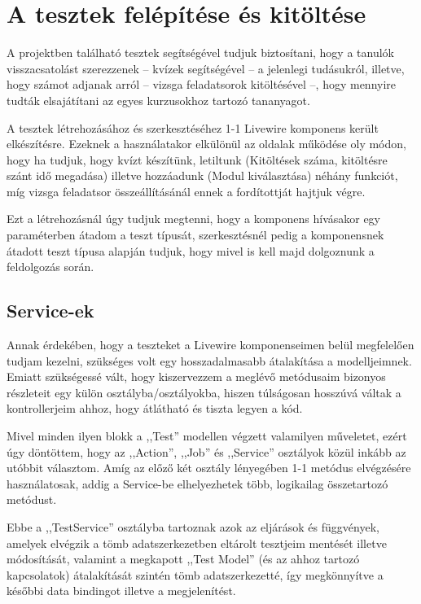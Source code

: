 \documentclass[
]{thesis-ekf}
\theoremstyle{definition}
\theoremstyle{remark}
\begin{document}
        \chapter{A tesztek felépítése és kitöltése}\label{Tesztek-bemutat}
            A projektben található tesztek segítségével tudjuk biztosítani, hogy a tanulók visszacsatolást szerezzenek -- kvízek segítségével -- a jelenlegi tudásukról, illetve, hogy számot adjanak arról -- vizsga feladatsorok kitöltésével --, hogy mennyire tudták elsajátítani az egyes kurzusokhoz tartozó tananyagot.

            A tesztek létrehozásához és szerkesztéséhez 1-1 Livewire komponens került elkészítésre. Ezeknek a használatakor elkülönül az oldalak működése oly módon, hogy ha tudjuk, hogy kvízt készítünk, letiltunk (Kitöltések száma, kitöltésre szánt idő megadása) illetve hozzáadunk (Modul kiválasztása) néhány funkciót, míg vizsga feladatsor összeállításánál ennek a fordítottját hajtjuk végre. 
            
            Ezt a létrehozásnál úgy tudjuk megtenni, hogy a komponens hívásakor egy paraméterben átadom a teszt típusát, szerkesztésnél pedig a komponensnek átadott teszt típusa alapján tudjuk, hogy mivel is kell majd dolgoznunk a feldolgozás során.
      
            \section{Service-ek}
            Annak érdekében, hogy a teszteket a Livewire komponenseimen belül megfelelően tudjam kezelni, szükséges volt egy hosszadalmasabb átalakítása a modelljeimnek. Emiatt szükségessé vált, hogy kiszervezzem a meglévő metódusaim bizonyos részleteit egy külön osztályba/osztályokba, hiszen túlságosan hosszúvá váltak a kontrollerjeim ahhoz, hogy átlátható és tiszta legyen a kód.

            Mivel minden ilyen blokk a ,,Test'' modellen végzett valamilyen műveletet, ezért úgy döntöttem, hogy az ,,Action'', ,,Job'' és ,,Service'' osztályok közül inkább az utóbbit választom. Amíg az előző két osztály lényegében 1-1 metódus elvégzésére használatosak, addig a Service-be elhelyezhetek több, logikailag összetartozó metódust. 
            
            Ebbe a ,,TestService'' osztályba tartoznak azok az eljárások és függvények, amelyek elvégzik a tömb adatszerkezetben eltárolt tesztjeim mentését illetve módosítását, valamint a megkapott ,,Test Model'' (és az ahhoz tartozó kapcsolatok) átalakítását szintén tömb adatszerkezetté, így megkönnyítve a későbbi data bindingot illetve a megjelenítést.
\end{document}
